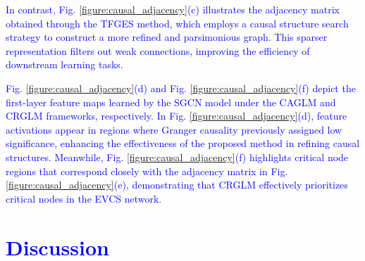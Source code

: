 \documentclass[lettersize,journal]{IEEEtran}
\newcommand{\hl}[1]{\textcolor{blue}{#1}}
\begin{document}
\hl{In contrast, Fig. \ref{figure:causal_adjacency}(c) illustrates the adjacency matrix obtained through the TFGES method, which employs a causal structure search strategy to construct a more refined and parsimonious graph. This sparser representation filters out weak connections, improving the efficiency of downstream learning tasks.}

\hl{Fig. \ref{figure:causal_adjacency}(d) and Fig. \ref{figure:causal_adjacency}(f) depict the first-layer feature maps learned by the SGCN model under the CAGLM and CRGLM frameworks, respectively. In Fig. \ref{figure:causal_adjacency}(d), feature activations appear in regions where Granger causality previously assigned low significance, enhancing the effectiveness of the proposed method in refining causal structures. Meanwhile, Fig. \ref{figure:causal_adjacency}(f) highlights critical node regions that correspond closely with the adjacency matrix in Fig. \ref{figure:causal_adjacency}(e), demonstrating that CRGLM effectively prioritizes critical nodes in the EVCS network.}

\section{\hl{Discussion}}
\label{section:discussion}
\end{document}
